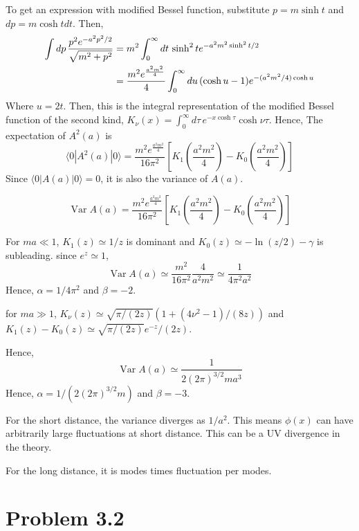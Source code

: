 \documentclass[a4paper,11pt]{article}
\begin{document}
To get an expression with modified Bessel function, substitute $p = m\sinh t$ and $dp = m\cosh t dt$. Then,
\begin{align}
    \int dp\,\frac{p^2 e^{-a^2p^2/2}}{\sqrt{m^2 + p^2}}
    &= m^2 \int_{0}^{\infty} dt\, \sinh^2 t e^{-a^2m^2\sinh^2 t/2}\notag\\
    &= \frac{m^2e^{\frac{a^2m^2}{4}}}{4} \int_{0}^{\infty} du\, (\cosh u - 1)e^{-(a^2m^2/4)\cosh u}
\end{align}
Where $u=2t$. Then, this is the integral representation of the modified Bessel function of the second kind, $K_\nu(x) = \int_0^\infty d\tau\, e^{-x\cosh \tau}\cosh \nu\tau$. Hence, The expectation of $A^2(a)$ is
\begin{equation}
    \langle 0|A^2(a)|0\rangle = \frac{m^2e^{\frac{a^2m^2}{4}}}{16\pi^2} \left[K_1\left(\frac{a^2m^2}{4}\right) - K_0\left(\frac{a^2m^2}{4}\right)\right]
\end{equation}
Since $\langle 0|A(a)|0\rangle = 0$, it is also the variance of $A(a)$.

\begin{equation}
    \operatorname{Var} A(a) = \frac{m^2e^{\frac{a^2m^2}{4}}}{16\pi^2} \left[K_1\left(\frac{a^2m^2}{4}\right) - K_0\left(\frac{a^2m^2}{4}\right)\right]
\end{equation}


For $ma\ll 1$, $K_1(z)\simeq 1/z$ is dominant and $K_0(z)\simeq -\ln (z/2)-\gamma$ is subleading. since $e^z\simeq 1$, 
\begin{equation}
    \operatorname{Var} A(a) \simeq \frac{m^2}{16\pi^2}\frac{4}{a^2m^2} \simeq \frac{1}{4\pi^2 a^2}
\end{equation}
Hence, $\alpha = 1 / 4\pi^2$ and $\beta=-2$.

for $ma\gg 1$, $K_\nu(z)\simeq\sqrt{\pi/(2z)}\left(1+ (4\nu^2 - 1)/(8z)\right)$ and $K_1(z) - K_0(z)\simeq \sqrt{\pi/(2z)}e^{-z}/(2z)$.

Hence,
\begin{equation}
\operatorname{Var} A(a) \simeq \frac{1}{2(2\pi)^{3/2} ma^3}
\end{equation}
Hence, $\alpha = 1 / (2(2\pi)^{3/2} m)$ and $\beta=-3$.

For the short distance, the variance diverges as $1/a^2$. This means $\phi(x)$ can have arbitrarily large fluctuations at short distance. This can be a UV divergence in the theory. 

For the long distance, it is modes times fluctuation per modes.


\section{Problem 3.2}
\end{document}
